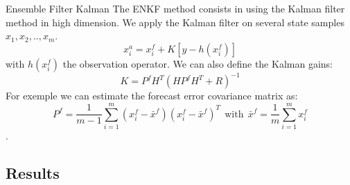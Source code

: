 \begin{frame}{Ensemble Filter Kalman}
    The ENKF method consists in using the Kalman filter method in high dimension.
    \newline We apply the Kalman filter on several state samples $x_1,x_2,..,x_{m}$.
    $$x_i^a=x_i^f+K[y-h(x_i^f)]$$
    with $h(x_i^f)$ the observation operator.
    We can also define the Kalman gains: 
    $$K=P^f H^T(HP^f H^T+R)^{-1}$$
    For exemple we can estimate the
    forecast error covariance matrix as:
    $$P^f=\frac{1}{m-1}\sum_{i=1}^{m}(x_i^f-\bar{x}^f)(x_i^f-\bar{x}^f)^T~~\text{with}~~\bar{x}^f=\frac{1}{m}\sum_{i=1}^{m}x_i^f $$ .
\end{frame}
\subsection{Results}
